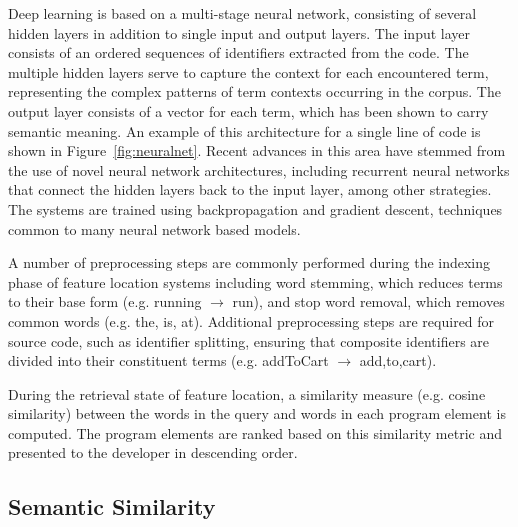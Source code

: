 Deep learning is based on a multi-stage neural network, consisting of
several hidden layers in addition to single input and output layers.
The input layer consists of an ordered sequences of identifiers
extracted from the code. The multiple hidden layers serve to capture
the context for each encountered term, representing the complex
patterns of term contexts occurring in the corpus. The output layer
consists of a vector for each term, which has been shown to carry
semantic meaning. An example of this architecture for a single line of
code is shown in Figure~\ref{fig:neuralnet}. Recent advances in this
area have stemmed from the use of novel neural network architectures,
including recurrent neural networks that connect the hidden layers
back to the input layer, among other strategies. The systems are
trained using backpropagation and gradient descent, techniques common
to many neural network based models.

 
A number of preprocessing steps are commonly performed during the
indexing phase of feature location systems including word stemming,
which reduces terms to their base form (e.g. running $\rightarrow$
run), and stop word removal, which removes common words (e.g. the, is,
at). Additional preprocessing steps are required for source code, such
as identifier splitting, ensuring that composite identifiers are
divided into their constituent terms (e.g. addToCart $\rightarrow$
add,to,cart). 


During the retrieval state of feature location, a similarity measure
(e.g. cosine similarity) between the words in the query and words in
each program element is computed. The program elements are ranked
based on this similarity metric and presented to the developer in
descending order.



\subsection{Semantic Similarity}

